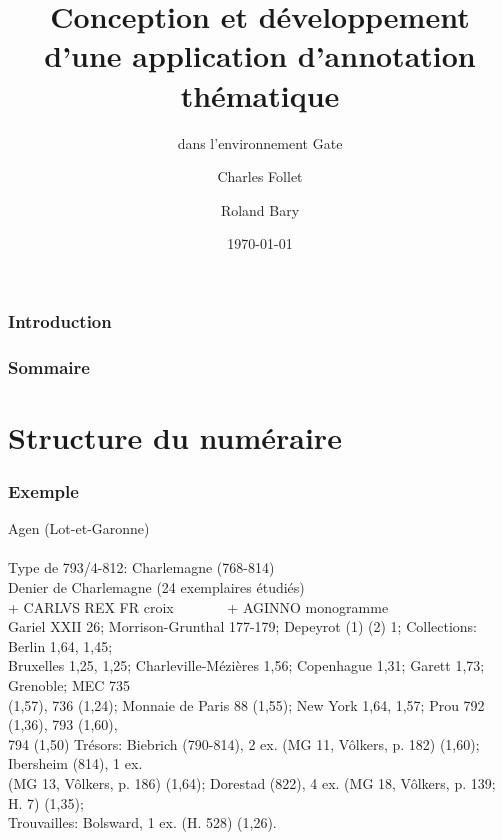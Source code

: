 \documentclass[10pt, compress]{beamer}
\title{Conception et développement d’une application d’annotation thématique}
\subtitle{dans l’environnement Gate}
\date{\today}
\author{Charles Follet \and Roland Bary}
\institute{Université de Pau et Pays de l'Adour}
\begin{document}
\maketitle
\begin{frame}[fragile]
  \frametitle{Introduction}
\end{frame}
\begin{frame}[fragile]
  \frametitle{Sommaire}
  \tableofcontents
\end{frame}
\section{Structure du numéraire}
\begin{frame}[fragile]
\frametitle{Exemple}
\begin{scriptsize}
Agen (Lot-et-Garonne)\\~\\

Type de 793/4-812: Charlemagne (768-814)\\
Denier de Charlemagne (24 exemplaires étudiés)\\
+ CARLVS REX FR croix~~~~~~~ + AGINNO monogramme\\
Gariel XXII 26; Morrison-Grunthal 177-179; Depeyrot (1) (2) 1; Collections: Berlin 1,64, 1,45;\\
Bruxelles 1,25, 1,25; Charleville-Mézières 1,56; Copenhague 1,31; Garett 1,73; Grenoble; MEC 735 \\
(1,57), 736 (1,24); Monnaie de Paris 88 (1,55); New York 1,64, 1,57; Prou 792 (1,36), 793 (1,60), \\
794 (1,50) Trésors: Biebrich (790-814), 2 ex. (MG 11, Vôlkers, p. 182) (1,60); Ibersheim (814), 1 ex. \\
(MG 13, Vôlkers, p. 186) (1,64); Dorestad (822), 4 ex. (MG 18, Vôlkers, p. 139; H. 7) (1,35);\\
Trouvailles: Bolsward, 1 ex. (H. 528) (1,26).
\end{scriptsize}
\end{frame}
\end{document}
